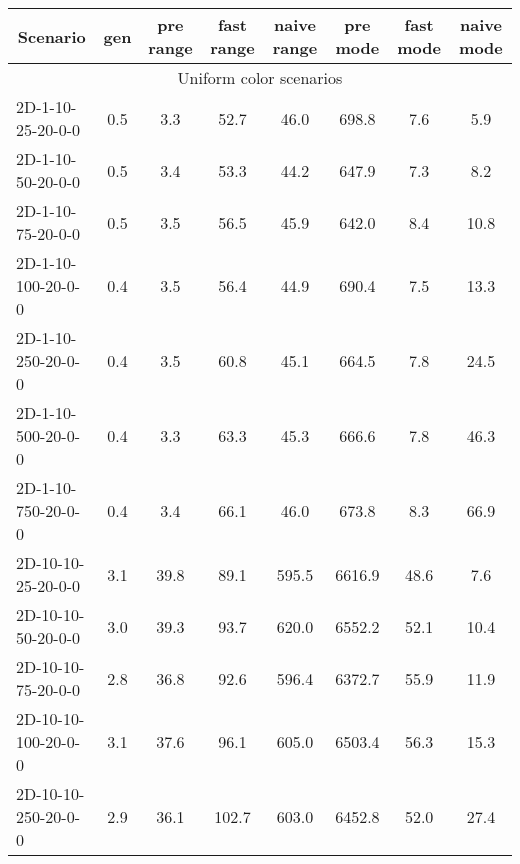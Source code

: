 \documentclass{article}
\begin{document}
\begin{center}
    \begin{table}[h]
        \hskip0.8cm
        \begin{tabular}{|l||c|c|c|c|c|c|c|}
            \hline
            \multicolumn{1}{|c|}{Scenario} & gen  & pre range & fast range & naive range & pre mode & fast mode & naive mode \\
            \hline
            \hline
            \multicolumn{8}{|c|}{Uniform color scenarios}                                                                    \\
            \hline
            2D-1-10-25-20-0-0              & 0.5  & 3.3       & 52.7       & 46.0        & 698.8    & 7.6       & 5.9        \\
            2D-1-10-50-20-0-0              & 0.5  & 3.4       & 53.3       & 44.2        & 647.9    & 7.3       & 8.2        \\
            2D-1-10-75-20-0-0              & 0.5  & 3.5       & 56.5       & 45.9        & 642.0    & 8.4       & 10.8       \\
            2D-1-10-100-20-0-0             & 0.4  & 3.5       & 56.4       & 44.9        & 690.4    & 7.5       & 13.3       \\
            2D-1-10-250-20-0-0             & 0.4  & 3.5       & 60.8       & 45.1        & 664.5    & 7.8       & 24.5       \\
            2D-1-10-500-20-0-0             & 0.4  & 3.3       & 63.3       & 45.3        & 666.6    & 7.8       & 46.3       \\
            2D-1-10-750-20-0-0             & 0.4  & 3.4       & 66.1       & 46.0        & 673.8    & 8.3       & 66.9       \\
            \hline
            2D-10-10-25-20-0-0             & 3.1  & 39.8      & 89.1       & 595.5       & 6616.9   & 48.6      & 7.6        \\
            2D-10-10-50-20-0-0             & 3.0  & 39.3      & 93.7       & 620.0       & 6552.2   & 52.1      & 10.4       \\
            2D-10-10-75-20-0-0             & 2.8  & 36.8      & 92.6       & 596.4       & 6372.7   & 55.9      & 11.9       \\
            2D-10-10-100-20-0-0            & 3.1  & 37.6      & 96.1       & 605.0       & 6503.4   & 56.3      & 15.3       \\
            2D-10-10-250-20-0-0            & 2.9  & 36.1      & 102.7      & 603.0       & 6452.8   & 52.0      & 27.4       \\

\end{tabular}
\end{table}
\end{center}
\end{document}
